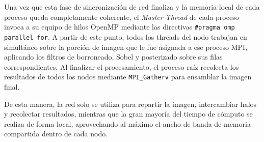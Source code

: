 Una vez que esta fase de sincronización de red finaliza y la memoria local de cada proceso queda completamente coherente, el \textit{Master Thread} de cada proceso invoca a su equipo de hilos OpenMP mediante las directivas \texttt{\#pragma omp parallel for}. A partir de este punto, todos los threads del nodo trabajan en simultáneo sobre la porción de imagen que le fue asignada a ese proceso MPI, aplicando los filtros de borroneado, Sobel y posterizado sobre sus filas correspondientes. Al finalizar el procesamiento, el proceso raíz recolecta los resultados de todos los nodos mediante \texttt{MPI\_Gatherv} para ensamblar la imagen final.

De esta manera, la red solo se utiliza para repartir la imagen, intercambiar halos y recolectar resultados, mientras que la gran mayoría del tiempo de cómputo se realiza de forma local, aprovechando al máximo el ancho de banda de memoria compartida dentro de cada nodo.